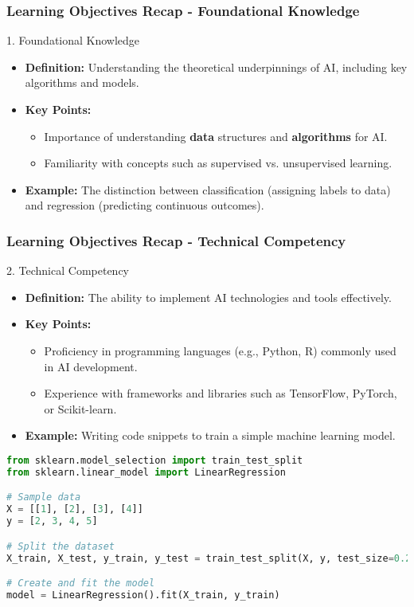 \documentclass[aspectratio=169]{beamer}
\begin{document}
\begin{frame}[fragile]
    \frametitle{Learning Objectives Recap - Foundational Knowledge}
    \begin{block}{1. Foundational Knowledge}
        \begin{itemize}
            \item \textbf{Definition:} Understanding the theoretical underpinnings of AI, including key algorithms and models.
            \item \textbf{Key Points:}
                \begin{itemize}
                    \item Importance of understanding \textbf{data} structures and \textbf{algorithms} for AI.
                    \item Familiarity with concepts such as supervised vs. unsupervised learning.
                \end{itemize}
            \item \textbf{Example:} The distinction between classification (assigning labels to data) and regression (predicting continuous outcomes).
        \end{itemize}
    \end{block}
\end{frame}

\begin{frame}[fragile]
    \frametitle{Learning Objectives Recap - Technical Competency}
    \begin{block}{2. Technical Competency}
        \begin{itemize}
            \item \textbf{Definition:} The ability to implement AI technologies and tools effectively.
            \item \textbf{Key Points:}
                \begin{itemize}
                    \item Proficiency in programming languages (e.g., Python, R) commonly used in AI development.
                    \item Experience with frameworks and libraries such as TensorFlow, PyTorch, or Scikit-learn.
                \end{itemize}
            \item \textbf{Example:} Writing code snippets to train a simple machine learning model.
        \end{itemize}
    \end{block}
    \begin{lstlisting}[language=Python]
from sklearn.model_selection import train_test_split
from sklearn.linear_model import LinearRegression

# Sample data
X = [[1], [2], [3], [4]]
y = [2, 3, 4, 5]

# Split the dataset
X_train, X_test, y_train, y_test = train_test_split(X, y, test_size=0.2)

# Create and fit the model
model = LinearRegression().fit(X_train, y_train)
    \end{lstlisting}
\end{frame}
\end{document}
